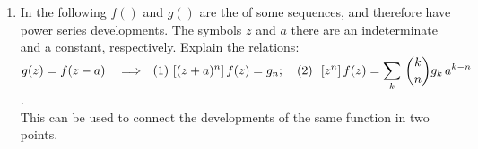 \begin{enumerate}
\item
In the following $f()$ and $g()$ are the  of some
sequences, and therefore have power series developments. The symbols
$z$ and $a$ there are an indeterminate and a constant, respectively.
Explain the relations:\\
$\displaystyle g(z)=f(z-a) ~~~\Longrightarrow~~(1)~[(z+a)^n]\,f(z)=g_n;
\quad (2)~~ [ z^n ]\,f(z) = \sum_{k} \,\binom{k}{ n} g_k \,a^{k-n} $.\\
This can be used to connect the developments of the same function in two
points.
\begin{comment}
Evidently, if $g(z)=f(z-a)$ holds, presumably for any value of $z$,
then also $g(z+a)=f(z)$.  The \lhs has the expansion
$g(z+a)=\suml_{k\ge0}g_k(z+a)^k$.  Hence the first claim:
$\DS[(z+a)^n]g(z+a) =[(z+a)^n]\suml_{k\ge0}g_k(z+a)^k=g_n$.
And since $g(z+a)=f(z)$, the claim holds.

The second one is more direct:
\[
[z^n]f(z) = [z^n]g(z+a)
=[z^n]\suml_{k\ge0}g_k(z+a)^k
=\suml_{k\ge0}g_k[z^n] \sum_j \binom kj z^ja^{k-j}
=\suml_{k\ge0}g_k \binom kn a^{k-n}
\]
where the extraction operator annihilates all the terms with powers of $z$
which are not $n$.


\end{comment}
\end{enumerate}
